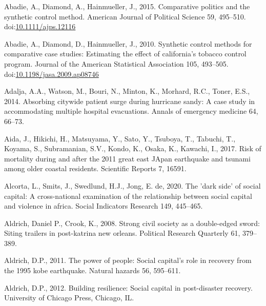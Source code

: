 \documentclass[]{elsarticle} %
\newlength{\cslhangindent}
\newlength{\cslentryspacingunit} %
\newenvironment{CSLReferences}[2] %
 {%
  \setlength{\parindent}{0pt}
  \ifodd #1
  \let\oldpar\par
  \def\par{\hangindent=\cslhangindent\oldpar}
  \fi
  \setlength{\parskip}{#2\cslentryspacingunit}
 }%
 {}
\begin{document}
\hypertarget{refs}{}
\begin{CSLReferences}{1}{0}
\leavevmode{}%
Abadie, A., Diamond, A., Hainmueller, J., 2015. Comparative politics and
the synthetic control method. American Journal of Political Science 59,
495--510.
doi:\href{https://doi.org/10.1111/ajps.12116}{10.1111/ajps.12116}

\leavevmode{}%
Abadie, A., Diamond, D., Hainmueller, J., 2010. Synthetic control
methods for comparative case studies: Estimating the effect of
california's tobacco control program. Journal of the American
Statistical Association 105, 493--505.
doi:\href{https://doi.org/10.1198/jasa.2009.ap08746}{10.1198/jasa.2009.ap08746}

\leavevmode{}%
Adalja, A.A., Watson, M., Bouri, N., Minton, K., Morhard, R.C., Toner,
E.S., 2014. Absorbing citywide patient surge during hurricane sandy: A
case study in accommodating multiple hospital evacuations. Annals of
emergency medicine 64, 66--73.

\leavevmode{}%
Aida, J., Hikichi, H., Matsuyama, Y., Sato, Y., Tsuboya, T., Tabuchi,
T., Koyama, S., Subramanian, S.V., Kondo, K., Osaka, K., Kawachi, I.,
2017. Risk of mortality during and after the 2011 great east JApan
earthquake and tsunami among older coastal residents. Scientific Reports
7, 16591.

\leavevmode{}%
Alcorta, L., Smits, J., Swedlund, H.J., Jong, E. de, 2020. The 'dark
side' of social capital: A cross-national examination of the
relationship between social capital and violence in africa. Social
Indicators Research 149, 445--465.

\leavevmode{}%
Aldrich, Daniel P., Crook, K., 2008. Strong civil society as a
double-edged sword: Siting trailers in post-katrina new orleans.
Political Research Quarterly 61, 379--389.

\leavevmode{}%
Aldrich, D.P., 2011. The power of people: Social capital's role in
recovery from the 1995 kobe earthquake. Natural hazards 56, 595--611.

\leavevmode{}%
Aldrich, D.P., 2012. Building resilience: Social capital in
post-disaster recovery. University of Chicago Press, Chicago, IL.


\end{CSLReferences}
\end{document}
